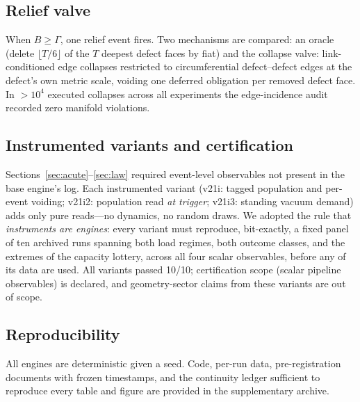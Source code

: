 \documentclass[11pt]{article}
\begin{document}
\subsection{Relief valve}
When $B\ge\Gamma$, one relief event fires. Two mechanisms are compared: an
oracle (delete $\lfloor T/6\rfloor$ of the $T$ deepest defect faces by fiat)
and the collapse valve: link-conditioned edge collapses \cite{hoppe}
restricted to circumferential defect--defect edges at the defect's own metric
scale, voiding one deferred obligation per removed defect face. In
$>10^4$ executed collapses across all experiments the edge-incidence audit
recorded zero manifold violations.

\subsection{Instrumented variants and certification}\label{sec:instruments}
Sections~\ref{sec:acute}--\ref{sec:law} required event-level observables not
present in the base engine's log. Each instrumented variant (v21i: tagged
population and per-event voiding; v21i2: population read \emph{at trigger};
v21i3: standing vacuum demand) adds only pure reads---no dynamics, no random
draws. We adopted the rule that \emph{instruments are engines}: every variant
must reproduce, bit-exactly, a fixed panel of ten archived runs spanning both
load regimes, both outcome classes, and the extremes of the capacity lottery,
across all four scalar observables, before any of its data are used. All
variants passed 10/10; certification scope (scalar pipeline observables) is
declared, and geometry-sector claims from these variants are out of scope.

\subsection{Reproducibility}
All engines are deterministic given a seed. Code, per-run data, pre-registration
documents with frozen timestamps, and the continuity ledger sufficient to
reproduce every table and figure are provided in the supplementary archive.
\end{document}
